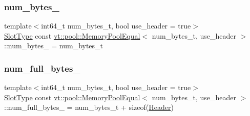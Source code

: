\subsubsection{\texorpdfstring{num\+\_\+bytes\+\_\+}{num\_bytes\_}}
{\footnotesize\ttfamily template$<$int64\+\_\+t num\+\_\+bytes\+\_\+t, bool use\+\_\+header = true$>$ \\
\hyperlink{structvt_1_1pool_1_1_memory_pool_equal_af05a2c24c95c666b20e3758745be746b}{Slot\+Type} const \hyperlink{structvt_1_1pool_1_1_memory_pool_equal}{vt\+::pool\+::\+Memory\+Pool\+Equal}$<$ num\+\_\+bytes\+\_\+t, use\+\_\+header $>$\+::num\+\_\+bytes\+\_\+ = num\+\_\+bytes\+\_\+t\hspace{0.3cm}{\ttfamily [private]}}

\mbox{\label{structvt_1_1pool_1_1_memory_pool_equal_a70c83d8bfd3a1c0c8f2c1a4a27e2aa04}} 
\subsubsection{\texorpdfstring{num\+\_\+full\+\_\+bytes\+\_\+}{num\_full\_bytes\_}}
{\footnotesize\ttfamily template$<$int64\+\_\+t num\+\_\+bytes\+\_\+t, bool use\+\_\+header = true$>$ \\
\hyperlink{structvt_1_1pool_1_1_memory_pool_equal_af05a2c24c95c666b20e3758745be746b}{Slot\+Type} const \hyperlink{structvt_1_1pool_1_1_memory_pool_equal}{vt\+::pool\+::\+Memory\+Pool\+Equal}$<$ num\+\_\+bytes\+\_\+t, use\+\_\+header $>$\+::num\+\_\+full\+\_\+bytes\+\_\+ = num\+\_\+bytes\+\_\+t + sizeof(\hyperlink{structvt_1_1pool_1_1_header}{Header})\hspace{0.3cm}{\ttfamily [private]}}

\mbox{\label{structvt_1_1pool_1_1_memory_pool_equal_a25a2b249ba0983b65ec1e2877dbd4f19}} 
